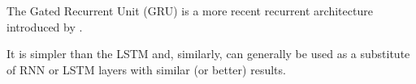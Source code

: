 

The Gated Recurrent Unit (GRU) is a more recent recurrent
architecture introduced by \textcite{cho2014learning}.

It is simpler than the LSTM and, similarly, can generally be
used as a substitute of RNN or LSTM layers with similar (or
better) results.
